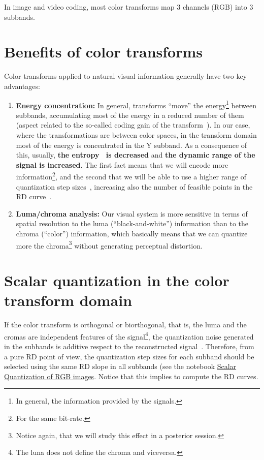 In image and video coding, most color transforms map 3 channels
($\text{RGB}$) into 3 subbands.

\section{Benefits of color transforms}

Color transforms applied to natural visual information generally have
two key advantages:
\begin{enumerate}
\item \textbf{Energy concentration:} In general, transforms ``move''
  the energy\footnote{In general, the information provided by the
    signals.} between subbands, accumulating most of the energy in a
  reduced number of them (aspect related to the so-called coding gain
  of the transform~\cite{vruiz__transform_coding}). In our case, where
  the transformations are between color spaces, in the transform
  domain most of the energy is concentrated in the $\text{Y}$
  subband. As a consequence of this, usually, \textbf{the
    entropy~\cite{vruiz__information_theory} is decreased} and
  \textbf{the dynamic range of the signal is increased}. The first
  fact means that we will encode more information\footnote{For the same
    bit-rate.}, and the second that we will be able to use a higher
  range of quantization step
  sizes~\cite{vruiz__scalar_quantization,sayood2017introduction},
  increasing also the number of feasible points in the RD
  curve~\cite{vruiz__information_theory}.
\item \textbf{Luma/chroma analysis:} Our visual system is more
  sensitive in terms of spatial resolution to the luma
  (``black-and-white'') information than to the chroma (``color'')
  information, which basically means that we can quantize more the
  chroma\footnote{Notice again, that we will study this effect in a
  posterior session.} without generating perceptual distortion. 
\end{enumerate}

\section{Scalar quantization in the color transform domain}

If the color transform is orthogonal or biorthogonal, that is, the
luma and the cromas are independent features of the
signal\footnote{The luna does not define the chroma and viceversa.},
the quantization noise generated in the subbands is additive respect
to the reconstructed signal~\cite{burger2016digital}. Therefore, from
a pure RD point of view, the quantization step sizes for each subband
should be selected using the same RD slope in all subbands (see the
notebook
\href{https://github.com/vicente-gonzalez-ruiz/color_transforms/blob/main/docs/RGB/RGB_SQ.ipynb}{Scalar
  Quantization of RGB images}. Notice that this implies to compute the
RD curves.

